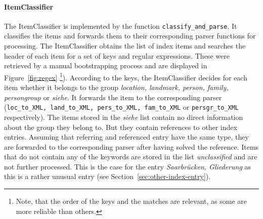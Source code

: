 \paragraph{ItemClassifier}
\label{sec:classifier}
The ItemClassifier is implemented by the function \texttt{classify\_and\_parse}. It classifies the items and forwards them to their corresponding parser functions for processing. The ItemClassifier obtains the list of index items and searches the header of each item for a set of keys and regular expressions. These were retrieved by a manual bootstrapping process and are displayed in Figure~\ref{fig:regex} \footnote{Note, that the order of the keys and the matches are relevant, as some are more reliable than others.}). According to the keys, the ItemClassifier decides for each item whether it belongs to the group \textit{location, landmark, person, family, persongroup} or \textit{siehe}. It forwards the item to the corresponding parser (\texttt{loc\_to\_XML, land\_to\_XML, pers\_to\_XML, fam\_to\_XML} or \texttt{persgr\_to\_XML} respectively). The items stored in the \textit{siehe} list contain no direct information about the group they belong to. But they contain references to other index entries. Assuming that referring and referenced entry have the same type, they are forwarded to the corresponding parser after having solved the reference. Items that do not contain any of the keywords are stored in the list \textit{unclassified} and are not further processed. This is the case for the entry \textit{Saarbrücken, Gliederung} as this is a rather unusual entry (see Section~\ref{sec:other-index-entry}).

